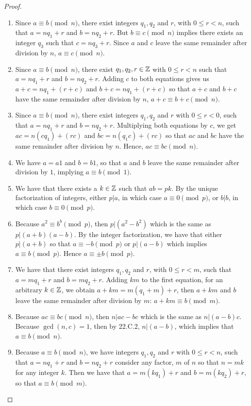 \begin{proof}
 \begin{enumerate}
     \item Since $a\equiv b\pmod{n}$, there exist integers $q_{1},q_{2}$ and $r$, with $0\leq r<n$, such that $a=nq_{1}+r$ and $b=nq_{2}+r$. But $b\equiv c\pmod{n}$ implies there exists an integer $q_{3}$ such that $c=nq_{3}+r$. Since $a$ and $c$ leave the same remainder after division by $n$, $a\equiv c\pmod{n}$.
     \item Since $a\equiv b\pmod{n}$, there exist $q_{1},q_{2},r\in\mathbb{Z}$ with $0\leq r<n$ such that $a=nq_{1}+r$ and $b=nq_{2}+r$. Adding $c$ to both equations gives us $a+c=nq_{1}+(r+c)$ and $b+c=nq_{1}+(r+c)$ so that $a+c$ and $b+c$ have the same remainder after division by $n$, $a+c\equiv b+c\pmod{n}$.
     \item Since $a\equiv b\pmod{n}$, there exist integers $q_{1},q_{2}$ and $r$ with $0\leq r<0$, such that $a=nq_{1}+r$ and $b=nq_{2}+r$. Multiplying both equations by $c$, we get $ac=n(cq_{1})+(rc)$ and $bc=n(q_{1}c)+(rc)$ so that $ac$ and $bc$ have the same remainder after division by $n$. Hence, $ac\equiv bc\pmod{n}$.
     \item We have $a=a1$ and $b=b1$, so that $a$ and $b$ leave the same remainder after division by $1$, implying $a\equiv b\pmod{1}$.
     \item We have that there exists a $k\in\mathbb{Z}$ such that $ab=pk$. By the unique factorization of integers, either $p\vert a$, in which case $a\equiv 0\pmod{p}$, or $b\vert b$, in which case $b\equiv 0\pmod{p}$.
     \item Because $a^{2}\equiv b^{b}\pmod{p}$, then $p\vert (a^{2}-b^{2})$ which is the same as ${p\vert (a+b)(a-b)}$. By the integer factorization, we have that either $p\vert (a+b)$ so that $a\equiv -b\pmod{p}$ or $p\vert (a-b)$ which implies $a\equiv b\pmod{p}$. Hence $a\equiv \pm b\pmod{p}$.
     \item We have that there exist integers $q_{1},q_{2}$ and $r$, with $0\leq r<m$, such that $a=mq_{1}+r$ and $b=mq_{2}+r$. Adding $km$ to the first equation, for an arbitrary $k\in\mathbb{Z}$, we obtain $a+km=m(q_{1}+m)+r$, then $a+km$ and $b$ leave the same remainder after division by $m$: $a+km\equiv b\pmod{m}$.
     \item Because $ac\equiv bc\pmod{n}$, then $n\vert ac-bc$ which is the same as $n\vert (a-b)c$. Because $\gcd(n,c)=1$, then by 22.C.2, $n\vert (a-b)$, which implies that $a\equiv b\pmod{n}$.
     \item Because $a\equiv b\pmod{n}$, we have integers $q_{1},q_{2}$ and $r$ with $0\leq r<n$, such that $a=nq_{1}+r$ and $b=nq_{2}+r$ consider any factor, $m$ of $n$ so that $n=mk$ for any integer $k$. Then we have that $a=m(kq_{1})+r$ and $b=m(kq_{2})+r$, so that $a\equiv b\pmod{m}$.
 \end{enumerate}
\end{proof}


